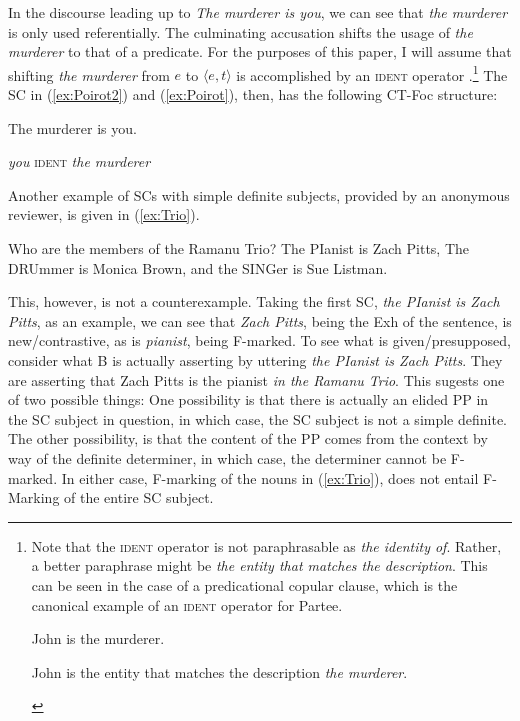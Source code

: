 \documentclass[
	letterpaper,
]{article}
\begin{document}
In the discourse leading up to \textit{The murderer is you}, we can see that \textit{the murderer} is only used referentially.
The culminating accusation shifts the usage of \textit{the murderer} to that of a predicate.
For the purposes of this paper, I will assume that shifting \textit{the murderer} from $e$ to $\langle e, t\rangle$ is accomplished by an \textsc{ident} operator \parencite[cf.][]{partee1987noun}.\footnote{
	Note that the \textsc{ident} operator is not paraphrasable as \textit{the identity of}.
	Rather, a better paraphrase might be \textit{the entity that matches the description}.
	This can be seen in the case of a predicational copular clause, which is the canonical example of an \textsc{ident} operator for Partee.
	\begin{xlisti}
		\ex John is the murderer.
		\begin{xlista}
			\ex John is the entity that matches the description \textit{the murderer}.
		\end{xlista}
	\end{xlisti}
}
The SC in (\ref{ex:Poirot2}) and (\ref{ex:Poirot}), then, has the following CT-Foc structure:
\begin{exe}
\ex The murderer is you.
\begin{xlist}
 \textit{you}
 \textsc{ident}
 \textit{the murderer}	
\end{xlist}	
\end{exe}
Another example of SCs with simple definite subjects, provided by an anonymous reviewer, is given in (\ref{ex:Trio}).
\begin{exe}
	\ex\label{ex:Trio}
\begin{xlist}
	 Who are the members of the Ramanu Trio?
	 The PIanist is Zach Pitts, The DRUmmer is Monica Brown, and the SINGer is Sue Listman.
\end{xlist}	
\end{exe}

This, however, is not a counterexample.
Taking the first SC, \textit{the PIanist is Zach Pitts}, as an example, we can see that \textit{Zach Pitts}, being the Exh of the sentence, is new/contrastive, as is \textit{pianist}, being F-marked.
To see what is given/presupposed, consider what B is actually asserting by uttering \textit{the PIanist is Zach Pitts}.
They are asserting that Zach Pitts is the pianist \textit{in the Ramanu Trio}.
This sugests one of two possible things:
One possibility is that there is actually an elided PP in the SC subject in question, in which case, the SC subject is not a simple definite.
The other possibility, is that the content of the PP comes from the context by way of the definite determiner, in which case, the determiner cannot be F-marked.
In either case, F-marking of the nouns in (\ref{ex:Trio}), does not entail F-Marking of the entire SC subject.
\end{document}
